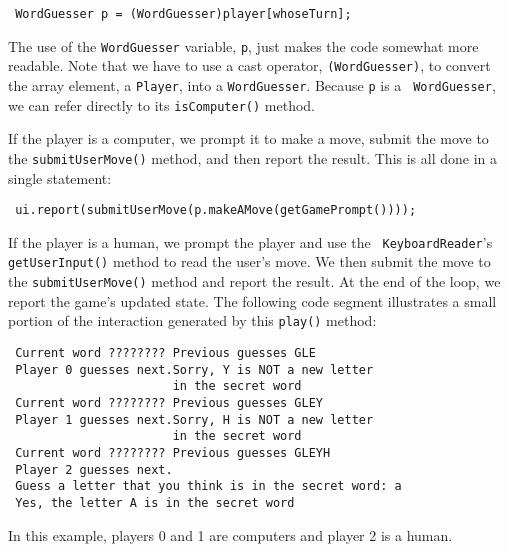 \begin{jjjlisting}
\begin{lstlisting}
 WordGuesser p = (WordGuesser)player[whoseTurn];
\end{lstlisting}
\end{jjjlisting}

\noindent The use of the {\tt WordGuesser} variable, {\tt p},  
just makes the code somewhat more readable. Note that we have to use
a cast operator, {\tt (WordGuesser)}, to convert the array element, a
{\tt Player}, into a {\tt WordGuesser}.  Because {\tt p} is a {\tt
WordGuesser}, we can refer directly to its {\tt isComputer()} method. 

If the player is a computer, we prompt it to make a move, submit
the move to the {\tt submitUserMove()} method, and then report the
result.  This is all done in a single statement:

\begin{jjjlisting}
\begin{lstlisting}
 ui.report(submitUserMove(p.makeAMove(getGamePrompt())));
\end{lstlisting}
\end{jjjlisting}

\noindent If the player is a human, we prompt the player and use the {\tt
KeyboardReader}'s {\tt getUserInput()} method to read the user's move.
We then submit the move to the {\tt submitUserMove()} method and
report the result.  At the end of the loop, we report the game's
updated state. The following code segment illustrates a small portion
of the interaction generated by this {\tt play()} method:

\begin{jjjlisting}
\begin{lstlisting}
 Current word ???????? Previous guesses GLE
 Player 0 guesses next.Sorry, Y is NOT a new letter 
                       in the secret word
 Current word ???????? Previous guesses GLEY
 Player 1 guesses next.Sorry, H is NOT a new letter 
                       in the secret word
 Current word ???????? Previous guesses GLEYH
 Player 2 guesses next.
 Guess a letter that you think is in the secret word: a
 Yes, the letter A is in the secret word
\end{lstlisting}
\end{jjjlisting}

\noindent In this example, players 0 and 1 are computers and player 2 is
a human. 


